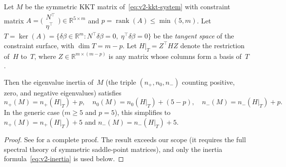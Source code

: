 
\begin{lemma}%
\label{lem:v2-kkt-inertia}
Let $M$ be the symmetric KKT matrix
of~\eqref{eq:v2-kkt-system} with
constraint matrix
$A = \bigl(\begin{smallmatrix} N^\top \\ \eta^\top
  \end{smallmatrix}\bigr) \in \mathbb{R}^{5 \times m}$
and $p = \operatorname{rank}(A) \leq \min(5, m)$.
Let $T = \ker(A) = \{\delta\beta \in \mathbb{R}^m :
  N^\top\delta\beta = 0,\; \eta^\top\delta\beta = 0\}$
be the \emph{tangent space} of the constraint surface,
with $\dim T = m - p$.
Let $H|_T = Z^\top H Z$ denote the restriction of~$H$
to~$T$, where $Z \in \mathbb{R}^{m \times (m-p)}$ is any
matrix whose columns form a basis of~$T$.

Then the eigenvalue inertia of~$M$
(the triple $(n_+, n_0, n_-)$ counting positive, zero,
and negative eigenvalues) satisfies
\begin{equation}\label{eq:v2-inertia}
  n_+(M) = n_+(H|_T) + p, \quad
  n_0(M) = n_0(H|_T) + (5 - p), \quad
  n_-(M) = n_-(H|_T) + p.
\end{equation}
In the generic case ($m \geq 5$ and $p = 5$), this
simplifies to
$n_+(M) = n_+(H|_T) + 5$ and
$n_-(M) = n_-(H|_T) + 5$.
\end{lemma}

\begin{proof}
See \cite[Thm.~3.2]{BenziGolubLiesen2005} for a
complete proof.
The result exceeds our scope (it requires the full
spectral theory of symmetric saddle-point matrices),
and only the inertia
formula~\eqref{eq:v2-inertia} is used below.
\end{proof}


